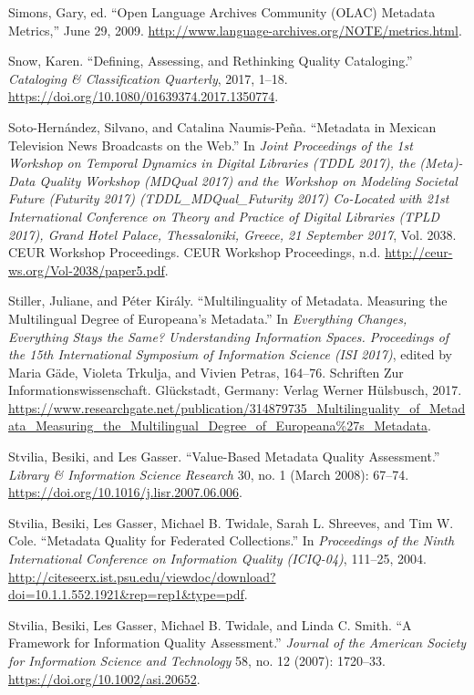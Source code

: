 Simons, Gary, ed. “Open Language Archives Community (OLAC) Metadata Metrics,” June 29, 2009. \url{http://www.language-archives.org/NOTE/metrics.html}.

Snow, Karen. “Defining, Assessing, and Rethinking Quality Cataloging.” \emph{Cataloging \& Classification Quarterly}, 2017, 1–18. \url{https://doi.org/10.1080/01639374.2017.1350774}.

Soto-Hernández, Silvano, and Catalina Naumis-Peña. “Metadata in Mexican Television News Broadcasts on the Web.” In \emph{Joint Proceedings of the 1st Workshop on Temporal Dynamics in Digital Libraries (TDDL 2017), the (Meta)-Data Quality Workshop (MDQual 2017) and the Workshop on Modeling Societal Future (Futurity 2017) (TDDL\_MDQual\_Futurity 2017) Co-Located with 21st International Conference on Theory and Practice of Digital Libraries (TPLD 2017), Grand Hotel Palace, Thessaloniki, Greece, 21 September 2017}, Vol. 2038. CEUR Workshop Proceedings. CEUR Workshop Proceedings, n.d. \url{http://ceur-ws.org/Vol-2038/paper5.pdf}.

Stiller, Juliane, and Péter Király. “Multilinguality of Metadata. Measuring the Multilingual Degree of Europeana’s Metadata.” In \emph{Everything Changes, Everything Stays the Same? Understanding Information Spaces. Proceedings of the 15th International Symposium of Information Science (ISI 2017)}, edited by Maria Gäde, Violeta Trkulja, and Vivien Petras, 164–76. Schriften Zur Informationswissenschaft. Glückstadt, Germany: Verlag Werner Hülsbusch, 2017. \url{https://www.researchgate.net/publication/314879735_Multilinguality_of_Metadata_Measuring_the_Multilingual_Degree_of_Europeana%27s_Metadata}.

Stvilia, Besiki, and Les Gasser. “Value-Based Metadata Quality Assessment.” \emph{Library \& Information Science Research} 30, no. 1 (March 2008): 67–74. \url{https://doi.org/10.1016/j.lisr.2007.06.006}.

Stvilia, Besiki, Les Gasser, Michael B. Twidale, Sarah L. Shreeves, and Tim W. Cole. “Metadata Quality for Federated Collections.” In \emph{Proceedings of the Ninth International Conference on Information Quality (ICIQ-04)}, 111–25, 2004. \url{http://citeseerx.ist.psu.edu/viewdoc/download?doi=10.1.1.552.1921\&rep=rep1\&type=pdf}.

Stvilia, Besiki, Les Gasser, Michael B. Twidale, and Linda C. Smith. “A Framework for Information Quality Assessment.” \emph{Journal of the American Society for Information Science and Technology} 58, no. 12 (2007): 1720–33. \url{https://doi.org/10.1002/asi.20652}.

